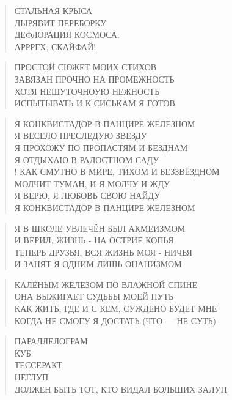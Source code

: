 \poemtitle{***}
\begin{verse}
СТАЛЬНАЯ КРЫСА \\
ДЫРЯВИТ ПЕРЕБОРКУ\\
ДЕФЛОРАЦИЯ КОСМОСА.\\
АРРРГХ, СКАЙФАЙ!
\end{verse}

\poemtitle{***}
\begin{verse}
ПРОСТОЙ СЮЖЕТ МОИХ СТИХОВ\\
ЗАВЯЗАН ПРОЧНО НА ПРОМЕЖНОСТЬ\\
ХОТЯ НЕШУТОЧНОУЮ  НЕЖНОСТЬ\\
ИСПЫТЫВАТЬ И К СИСЬКАМ Я ГОТОВ
\end{verse}

\poemtitle{***}
\begin{verse}
Я КОНКВИСТАДОР В ПАНЦИРЕ ЖЕЛЕЗНОМ\\
Я ВЕСЕЛО ПРЕСЛЕДУЮ ЗВЕЗДУ\\
Я ПРОХОЖУ ПО ПРОПАСТЯМ И БЕЗДНАМ\\
Я ОТДЫХАЮ В РАДОСТНОМ САДУ\\!
КАК СМУТНО В МИРЕ, ТИХОМ И БЕЗЗВЁЗДНОМ\\
МОЛЧИТ ТУМАН, И Я МОЛЧУ И ЖДУ\\
Я ВЕРЮ, Я ЛЮБОВЬ СВОЮ НАЙДУ\\
Я КОНКВИСТАДОР В ПАНЦИРЕ ЖЕЛЕЗНОМ
\end{verse}

\poemtitle{***}
\begin{verse}
Я В ШКОЛЕ УВЛЕЧЁН БЫЛ АКМЕИЗМОМ\\
И ВЕРИЛ, ЖИЗНЬ - НА ОСТРИЕ КОПЬЯ\\
ТЕПЕРЬ ДРУЗЬЯ, ВСЯ ЖИЗНЬ МОЯ - НИЧЬЯ\\
И ЗАНЯТ Я ОДНИМ ЛИШЬ ОНАНИЗМОМ
\end{verse}

\poemtitle{***}
\begin{verse}
КАЛЁНЫМ ЖЕЛЕЗОМ ПО ВЛАЖНОЙ СПИНЕ\\
ОНА ВЫЖИГАЕТ СУДЬБЫ МОЕЙ ПУТЬ\\
КАК ЖИТЬ, ГДЕ И С КЕМ, СУЖДЕНО БУДЕТ МНЕ\\
КОГДА НЕ СМОГУ Я ДОСТАТЬ (ЧТО — НЕ СУТЬ)
\end{verse}

\poemtitle{***}
\begin{verse}
ПАРАЛЛЕЛОГРАМ\\
КУБ\\
ТЕССЕРАКТ\\
НЕГЛУП\\
ДОЛЖЕН БЫТЬ ТОТ, КТО ВИДАЛ БОЛЬШИХ ЗАЛУП
\end{verse}

